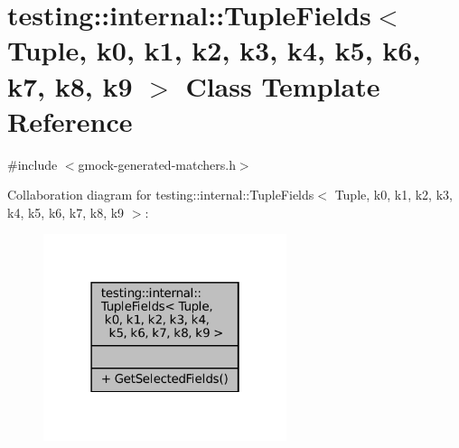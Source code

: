 \hypertarget{classtesting_1_1internal_1_1TupleFields}{}\section{testing\+:\+:internal\+:\+:Tuple\+Fields$<$ Tuple, k0, k1, k2, k3, k4, k5, k6, k7, k8, k9 $>$ Class Template Reference}
\label{classtesting_1_1internal_1_1TupleFields}


{\ttfamily \#include $<$gmock-\/generated-\/matchers.\+h$>$}



Collaboration diagram for testing\+:\+:internal\+:\+:Tuple\+Fields$<$ Tuple, k0, k1, k2, k3, k4, k5, k6, k7, k8, k9 $>$\+:
\nopagebreak
\begin{figure}[H]
\begin{center}
\leavevmode
\includegraphics[width=202pt]{classtesting_1_1internal_1_1TupleFields__coll__graph}
\end{center}
\end{figure}
